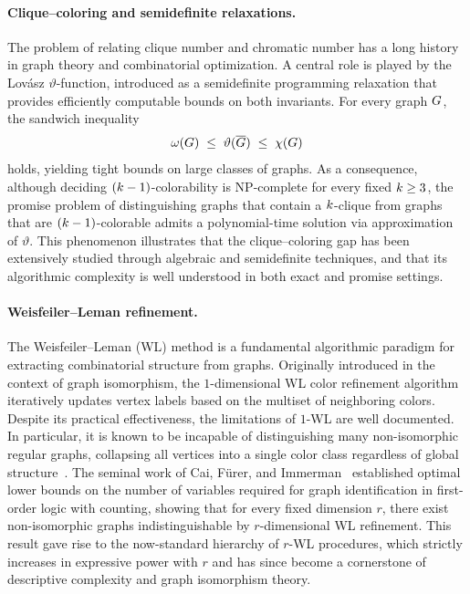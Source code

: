 \paragraph{Clique--coloring and semidefinite relaxations.}
The problem of relating clique number and chromatic number has a long history in graph theory and combinatorial optimization. A central role is played by the Lovász $\vartheta$-function, introduced as a semidefinite programming relaxation that provides efficiently computable bounds on both invariants. For every graph $G$, the sandwich inequality
\[
\omega(G) \;\le\; \vartheta(\overline{G}) \;\le\; \chi(G)
\]
holds, yielding tight bounds on large classes of graphs. As a consequence, although deciding $(k-1)$-colorability is NP-complete for every fixed $k \ge 3$, the promise problem of distinguishing graphs that contain a $k$-clique from graphs that are $(k-1)$-colorable admits a polynomial-time solution via approximation of $\vartheta$. This phenomenon illustrates that the clique--coloring gap has been extensively studied through algebraic and semidefinite techniques, and that its algorithmic complexity is well understood in both exact and promise settings.

\paragraph{Weisfeiler--Leman refinement.}
The Weisfeiler--Leman (WL) method is a fundamental algorithmic paradigm for extracting combinatorial structure from graphs. Originally introduced in the context of graph isomorphism, the $1$-dimensional WL color refinement algorithm iteratively updates vertex labels based on the multiset of neighboring colors. Despite its practical effectiveness, the limitations of $1$-WL are well documented. In particular, it is known to be incapable of distinguishing many non-isomorphic regular graphs, collapsing all vertices into a single color class regardless of global structure~\cite{Douglas2011,LowerBoundGraphIdentification}. The seminal work of Cai, Fürer, and Immerman~\cite{LowerBoundGraphIdentification} established optimal lower bounds on the number of variables required for graph identification in first-order logic with counting, showing that for every fixed dimension $r$, there exist non-isomorphic graphs indistinguishable by $r$-dimensional WL refinement. This result gave rise to the now-standard hierarchy of $r$-WL procedures, which strictly increases in expressive power with $r$ and has since become a cornerstone of descriptive complexity and graph isomorphism theory.

